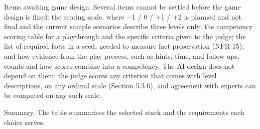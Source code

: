 Items awaiting game design. Several items cannot be settled before the game design is fixed: the scoring scale, where $-$1 / 0 / +1 / +2 is planned and not final and the current sample scenarios describe three levels only; the competency scoring table for a playthrough and the specific criteria given to the judge; the list of required facts in a seed, needed to measure fact preservation (NFR-15); and how evidence from the play process, such as hints, time, and follow-ups, counts and how scores combine into a competency. The AI design does not depend on them: the judge scores any criterion that comes with level descriptions, on any ordinal scale (Section 5.3.6), and agreement with experts can be computed on any such scale.

Summary. The table summarises the selected stack and the requirements each choice serves.

